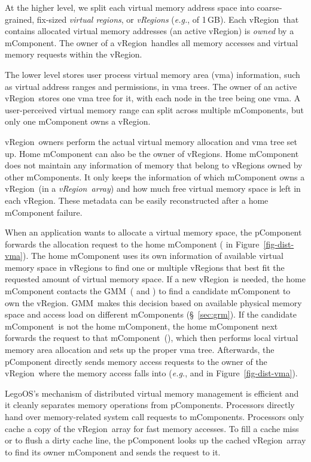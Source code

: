 \documentclass[10pt,times,twocolumn]{z2-article}
\newcommand*\circled[1]{\tikz[baseline=-3pt]{
            \node[shape=circle,draw,inner sep=1pt,minimum size=10pt] (char) {\small #1};}}
\renewcommand{\em}{\it}
\newcommand{\eg}{\textit{e.g.}}
\newcommand{\GB}{\,GB}
\newcommand{\lego}{LegoOS}
\newcommand{\gmm}{GMM}
\newcommand{\vregion}{vRegion}
\newcommand{\pcomponent}{pComponent}
\newcommand{\mcomponent}{mComponent}
\begin{document}
{{{{{{{At the higher level, we split each virtual memory address space into coarse-grained, fix-sized {\em virtual regions},
or {\em \vregion{}s} (\eg, of 1\GB).
Each \vregion\ that contains allocated virtual memory addresses (an active \vregion) is {\em owned} by a \mcomponent{}.
The owner of a \vregion\ handles all memory accesses and virtual memory requests within the \vregion.

The lower level stores user process virtual memory area (vma) information,
such as virtual address ranges and permissions, in vma trees.
The owner of an active \vregion\ stores one vma tree for it,
with each node in the tree being one vma.
A user-perceived virtual memory range can split across multiple \mcomponent{}s,
but only one \mcomponent{} owns a \vregion.

\vregion\ owners perform the actual virtual memory allocation and vma tree set up.
Home \mcomponent{} can also be the owner of \vregion{}s.
Home \mcomponent{} does not maintain any information of memory that belong to \vregion{}s owned by other \mcomponent{}s.
It only keeps the information of which \mcomponent{} owns a \vregion\ (in a {\em \vregion\ array})
and how much free virtual memory space is left in each \vregion.
These metadata can be easily reconstructed after a home \mcomponent{} failure.

When an application wants to allocate a virtual memory space,
the \pcomponent{} forwards the allocation request 
to the home \mcomponent{} (\circled{1} in Figure~\ref{fig-dist-vma}).
The home \mcomponent{} uses its own information of available virtual memory space in \vregion{}s
to find one or multiple \vregion{}s that best fit the requested amount of virtual memory space.
If a new \vregion\ is needed, the home \mcomponent{} contacts the \gmm\ (\circled{2} and \circled{3}) 
to find a candidate \mcomponent{} to own the \vregion.
\gmm\ makes this decision based on available physical memory space and access load on different \mcomponent{}s (\S~\ref{sec:grm}).
If the candidate \mcomponent\ is not the home \mcomponent{}, the home \mcomponent{} next forwards the request to that \mcomponent\ (\circled{4}),
which then performs local virtual memory area allocation and sets up the proper vma tree. 
Afterwards, the \pcomponent{} directly sends memory access requests to the owner of the \vregion\ where the memory access falls into
(\eg, \circled{a} and \circled{c} in Figure~\ref{fig-dist-vma}).


\lego's mechanism of distributed virtual memory management is efficient and it cleanly separates memory operations from \pcomponent{}s.
Processors directly hand over memory-related system call requests to \mcomponent{}s.
Processors only cache a copy of the \vregion\ array for fast memory accesses.
To fill a cache miss or to flush a dirty cache line, 
the \pcomponent{} looks up the cached \vregion\ array to find its owner \mcomponent{} and sends the request to it.

}}}}}}}
\end{document}
